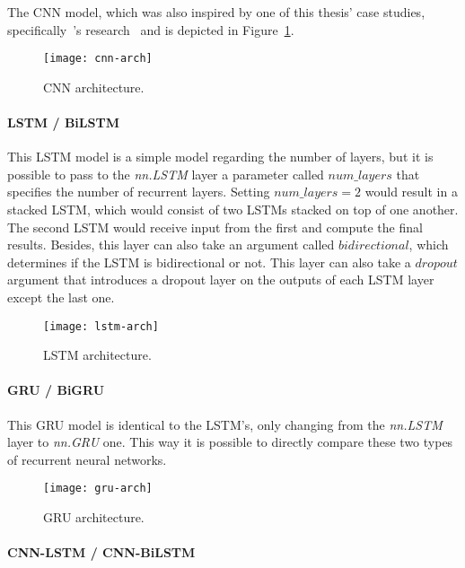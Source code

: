 The \gls{CNN} model, which was also inspired by one of this thesis' case studies, specifically~\citeauthor{Zou2018AGenomics}'s research~\cite{Zou2018AGenomics} and is depicted in Figure~\ref{fig:cnn-arch}. 

\begin{figure}[htbp]
    \centering
    \texttt{[image: cnn-arch]}
    \caption{CNN architecture.}
    \label{fig:cnn-arch}
\end{figure}

\paragraph{LSTM / BiLSTM}

This \gls{LSTM} model is a simple model regarding the number of layers, but it is possible to pass to the \textit{nn.LSTM} layer a parameter called $num\_layers$ that specifies the number of recurrent layers. Setting $num \_layers = 2$ would result in a stacked \gls{LSTM}, which would consist of two \gls{LSTM}s stacked on top of one another. The second \gls{LSTM} would receive input from the first and compute the final results. Besides, this layer can also take an argument called $bidirectional$, which determines if the \gls{LSTM} is bidirectional or not. This layer can also take a $dropout$ argument that introduces a dropout layer on the outputs of each \gls{LSTM} layer except the last one.

\begin{figure}[htbp]
    \centering
    \texttt{[image: lstm-arch]}
    \caption{LSTM architecture.}
    \label{fig:lstm-arch}
\end{figure}

\paragraph{GRU / BiGRU} This \gls{GRU} model is identical to the \gls{LSTM}'s, only changing from the \textit{nn.LSTM} layer to \textit{nn.GRU} one. This way it is possible to directly compare these two types of recurrent neural networks.

\begin{figure}[htbp]
    \centering
    \texttt{[image: gru-arch]}
    \caption{GRU architecture.}
    \label{fig:gru-arch}
\end{figure}

\paragraph{CNN-LSTM / CNN-BiLSTM}

